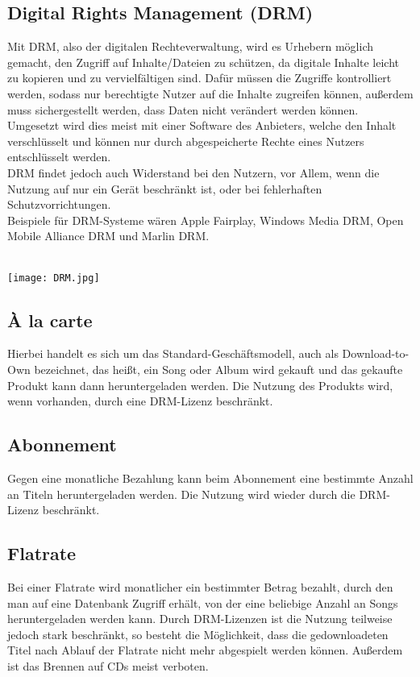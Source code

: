 \documentclass{article}
\begin{document}
	\subsection*{Digital Rights Management (DRM)}
	Mit DRM, also der digitalen Rechteverwaltung, wird es Urhebern möglich gemacht, den Zugriff auf Inhalte/Dateien zu schützen, da digitale Inhalte leicht zu kopieren und zu vervielfältigen sind. Dafür müssen die Zugriffe kontrolliert werden, sodass nur berechtigte Nutzer auf die Inhalte zugreifen können, außerdem muss sichergestellt werden, dass Daten nicht verändert werden können. Umgesetzt wird dies meist mit einer Software des Anbieters, welche den Inhalt verschlüsselt und können nur durch abgespeicherte Rechte eines Nutzers entschlüsselt werden. \\ 
	DRM findet jedoch auch Widerstand bei den Nutzern, vor Allem, wenn die Nutzung auf nur ein Gerät beschränkt ist, oder bei fehlerhaften Schutzvorrichtungen. \cite{drm} \cite{drmReport} \\
	Beispiele für DRM-Systeme wären Apple Fairplay, Windows Media DRM, Open Mobile Alliance DRM und Marlin DRM. \cite{drmsysteme} \\
	\\ \begin{center}\texttt{[image: DRM.jpg]} \cite{drmKritik}\end{center} 
	
	\subsection*{À la carte}
	Hierbei handelt es sich um das Standard-Geschäftsmodell, auch als Download-to-Own bezeichnet, das heißt, ein Song oder Album wird gekauft und das gekaufte Produkt kann dann heruntergeladen werden. Die Nutzung des Produkts wird, wenn vorhanden, durch eine DRM-Lizenz beschränkt. \cite{modelleWiki}
	
	\subsection*{Abonnement}
	Gegen eine monatliche Bezahlung kann beim Abonnement eine bestimmte Anzahl an Titeln heruntergeladen werden. Die Nutzung wird wieder durch die DRM-Lizenz beschränkt. \cite{modelleWiki}
	
	\subsection*{Flatrate}
	Bei einer Flatrate wird monatlicher ein bestimmter Betrag bezahlt, durch den man auf eine Datenbank Zugriff erhält, von der eine beliebige Anzahl an Songs heruntergeladen werden kann. Durch DRM-Lizenzen ist die Nutzung teilweise jedoch stark beschränkt, so besteht die Möglichkeit, dass die gedownloadeten Titel nach Ablauf der Flatrate nicht mehr abgespielt werden können. Außerdem ist das Brennen auf CDs meist verboten. \cite{modelleWiki}
	
\end{document}

